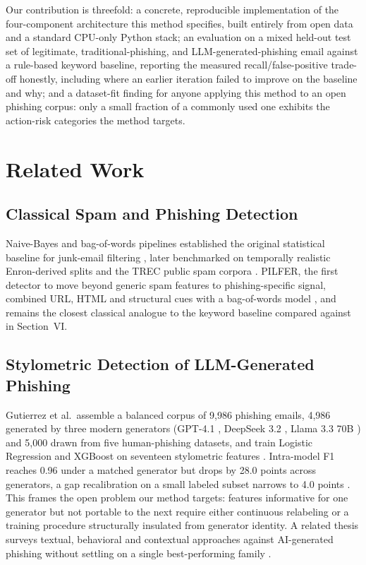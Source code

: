 \documentclass[conference]{IEEEtran}
\begin{document}
Our contribution is threefold: a concrete, reproducible implementation of the four-component architecture this method specifies, built entirely from open data and a standard CPU-only Python stack; an evaluation on a mixed held-out test set of legitimate, traditional-phishing, and LLM-generated-phishing email against a rule-based keyword baseline, reporting the measured recall/false-positive trade-off honestly, including where an earlier iteration failed to improve on the baseline and why; and a dataset-fit finding for anyone applying this method to an open phishing corpus: only a small fraction of a commonly used one exhibits the action-risk categories the method targets.

\section{Related Work}

\subsection{Classical Spam and Phishing Detection}

Naive-Bayes and bag-of-words pipelines established the original statistical baseline for junk-email filtering \cite{sahami1998bayesian}, later benchmarked on temporally realistic Enron-derived splits \cite{metsis2006enronspam} and the TREC public spam corpora \cite{cormack2007trec}. PILFER, the first detector to move beyond generic spam features to phishing-specific signal, combined URL, HTML and structural cues with a bag-of-words model \cite{fette2007pilfer}, and remains the closest classical analogue to the keyword baseline compared against in Section~VI.

\subsection{Stylometric Detection of LLM-Generated Phishing}

Gutierrez et al.\ assemble a balanced corpus of 9{,}986 phishing emails, 4{,}986 generated by three modern generators (GPT-4.1 \cite{openai2023gpt4}, DeepSeek 3.2 \cite{deepseek2024v3}, Llama 3.3 70B \cite{llama2024herd}) and 5{,}000 drawn from five human-phishing datasets, and train Logistic Regression and XGBoost on seventeen stylometric features \cite{S1}. Intra-model F1 reaches 0.96 under a matched generator but drops by 28.0 points across generators, a gap recalibration on a small labeled subset narrows to 4.0 points \cite{S1,S13}. This frames the open problem our method targets: features informative for one generator but not portable to the next require either continuous relabeling or a training procedure structurally insulated from generator identity. A related thesis surveys textual, behavioral and contextual approaches against AI-generated phishing without settling on a single best-performing family \cite{S3}.
\end{document}
